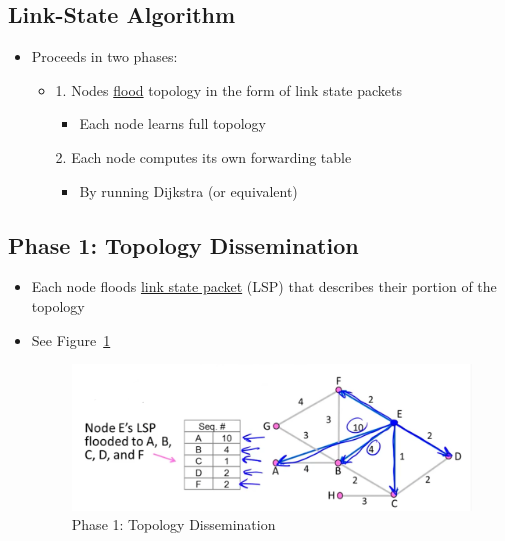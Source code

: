 \documentclass[12pt]{ctexart}   %
\begin{document}
	\subsection{Link-State Algorithm}
	\begin{itemize}
		\item Proceeds in two phases:
		\begin{itemize}
			\item {\color{blue} 1.} Nodes \underline{flood} topology in the form of link state packets
			\begin{itemize}
				\item Each node learns full topology
			\end{itemize}
			
			{\color{blue} 2.} Each node computes its own forwarding table
			\begin{itemize}
				\item By running Dijkstra (or equivalent)
			\end{itemize}
		\end{itemize}
	\end{itemize}
	
	\subsection{Phase 1: Topology Dissemination}
	\begin{itemize}
		\item Each node floods \underline{link state packet} (LSP) that describes their portion of the topology
		\item See Figure~\ref{fig:5-6-1}
			
		\begin{figure}[h!] %
		\centering
		 \includegraphics[scale=0.7]{images/5-6-1}
		\caption{ Phase 1: Topology Dissemination }
		 \label{fig:5-6-1}
		 \end{figure}
	\end{itemize}
	
\end{document}
